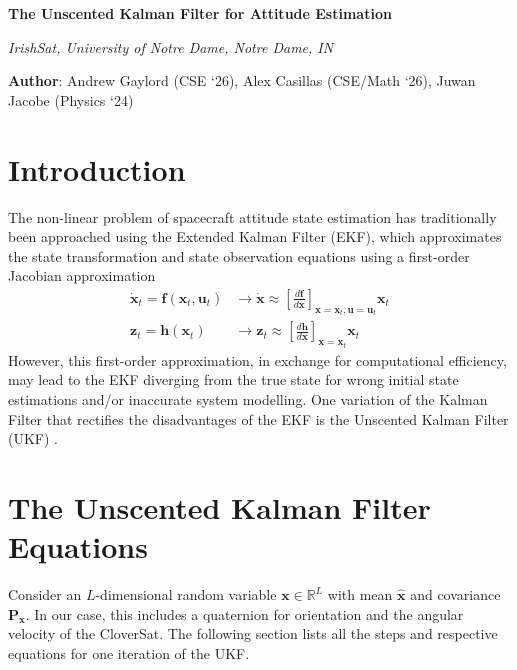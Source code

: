 \documentclass{article}
\newcommand{\x}{\mathbf{x}}
\newcommand{\xd}{\dot{\x}}
\newcommand{\f}{\mathbf{f}}
\newcommand{\ug}{\mathbf{u}}
\newcommand{\z}{\mathbf{z}}
\newcommand{\h}{\mathbf{h}}
\newcommand{\Px}{\mathbf{P_{\x}}}
\newcommand{\f}{\mathbf{f}}
\newcommand{\z}{\mathbf{z}}
\begin{document}

\singlespacing
\begin{center}
    \large \textbf{The Unscented Kalman Filter for Attitude Estimation} \\ \vskip 3pt

    \large \textit{IrishSat, University of Notre Dame, Notre Dame, IN} \\ \vskip 6pt
    
    \normalsize \textbf{Author}: Andrew Gaylord (CSE `26), Alex Casillas (CSE/Math `26), Juwan Jacobe (Physics `24)
\end{center}

\section{Introduction}
\label{sec:intro}
The non-linear problem of spacecraft attitude state estimation has traditionally been approached using the Extended Kalman Filter (EKF), which approximates the state transformation and state observation equations using a first-order Jacobian approximation
\begin{align*} 
\xd_t = \f(\x_t, \ug_t) &\rightarrow \xd \approx \left[ \frac{d\f}{d\x} \right]_{\x = \x_t, \ug = \ug_t} \x_t \\
\z_t = \h(\x_t) &\rightarrow \z_t \approx \left[ \frac{d\h}{d\x} \right]_{\x = \x_t} \x_t 
\end{align*}
However, this first-order approximation, in exchange for computational efficiency, may lead to the EKF diverging from the true state for wrong initial state estimations and/or inaccurate system modelling. One variation of the Kalman Filter that rectifies the disadvantages of the EKF is the Unscented Kalman Filter (UKF) \cite{UKF}.

\section{The Unscented Kalman Filter Equations}
Consider an $L$-dimensional random variable $\x \in \mathbb{R}^{L}$ with mean $\hat{\x}$ and covariance $\Px$. In our case, this includes a quaternion for orientation and the angular velocity of the CloverSat. The following section lists all the steps and respective equations for one iteration of the UKF.
\end{document}
